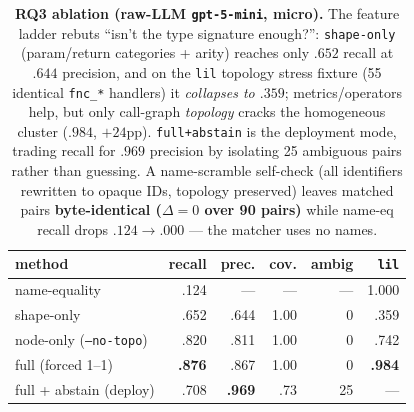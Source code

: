 \begin{table}[t]
  \centering
  \caption{\textbf{RQ3 ablation (raw-LLM \texttt{gpt-5-mini}, micro).} The feature
    ladder rebuts ``isn't the type signature enough?'': \texttt{shape-only}
    (param/return categories + arity) reaches only $.652$ recall at $.644$
    precision, and on the \texttt{lil} topology stress fixture (55 identical
    \texttt{fnc\_*} handlers) it \emph{collapses to $.359$}; metrics/operators help,
    but only call-graph \emph{topology} cracks the homogeneous cluster ($.984$,
    $+24$pp). \texttt{full+abstain} is the deployment mode, trading recall for
    $.969$ precision by isolating 25 ambiguous pairs rather than guessing. A
    name-scramble self-check (all identifiers rewritten to opaque IDs, topology
    preserved) leaves matched pairs \textbf{byte-identical ($\Delta=0$ over 90
    pairs)} while name-eq recall drops $.124\!\to\!.000$ --- the matcher uses no
    names.}
  \label{tab:rq3-ablation}
  \begin{tabular}{l r r r r r}
    \toprule
    method & recall & prec. & cov. & ambig & \texttt{lil} \\
    \midrule
    name-equality                  & .124 & ---  & ---  & ---  & 1.000 \\
    shape-only                     & .652 & .644 & 1.00 & 0    & .359 \\
    node-only (\texttt{--no-topo}) & .820 & .811 & 1.00 & 0    & .742 \\
    full (forced 1--1)             & \textbf{.876} & .867 & 1.00 & 0 & \textbf{.984} \\
    full + abstain (deploy)        & .708 & \textbf{.969} & .73 & 25 & --- \\
    \bottomrule
  \end{tabular}
\end{table}

